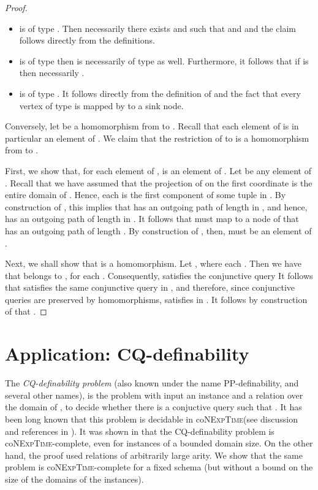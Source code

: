 \documentclass{article}
\newcommand{\nexptime}{\textsc{NExpTime}\xspace}
\begin{document}
\begin{proof}
\begin{itemize}
\item  is of type . Then necessarily there exists  and  such that  and  and the claim follows directly from the definitions.

\item  is of type  then  is necessarily of type  as well. Furthermore, it follows that if  is  then necessarily .




\item  is of type . It follows directly from the definition of  and the fact that every vertex of type  is mapped by  to a sink node.
\end{itemize}
 
 

Conversely, let  be a homomorphism from  to
. Recall that each element of  is in
particular an element of .  We claim that the
restriction of  to  is a
homomorphism from  to . 

First, we show 
that, for each element  of ,  is an
element of .
Let  be any element of .  Recall
that we have assumed that the projection of  on the first
coordinate is the entire domain of . Hence, each  is the
first component of some tuple in . By construction of
, this implies that  has an outgoing path of length
 in , and hence,  has an outgoing path of length 
in .  It follows that  must map  to a node of
 that has an outgoing path of length . By construction
of , then,  must be an element of .

Next, we shall show that  is a
homomorphism. Let
, where each . Then we have that
 belongs to ,  for each .
Consequently,  satisfies the conjunctive
query 
It follows that  satisfies the same conjunctive
query in , and therefore, since conjunctive
queries are preserved by homomorphisms, 
 satisfies  in . It follows by
construction of  that .
\end{proof}













\section{Application: CQ-definability}



The \emph{CQ-definability problem} (also known under the name
PP-definability, and several other names), is the problem with input an instance  and a relation 
over the domain of , to decide whether there is a conjuctive query
 such that .  It has been long known that this problem is
decidable in co\nexptime (see discussion and references in
\cite{Willard10}). It was shown in \cite{Willard10} that the
CQ-definability problem is co\nexptime-complete, even for instances of
a bounded domain size. On the other hand, the proof used relations of
arbitrarily large arity. We show that  the same problem is
co\nexptime-complete for a fixed schema (but without a bound on the
size of the domains of the instances).
\end{document}
